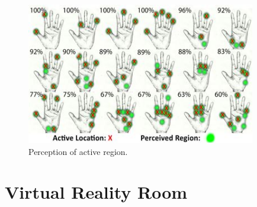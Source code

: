 \begin{figure}[!ht]
  \centering
  \includegraphics[width=10cm]{figures/figure6.jpg}
  \caption{Perception of active region.}
  \label{fig:glove-active}
\end{figure}


\section{Virtual Reality Room}
